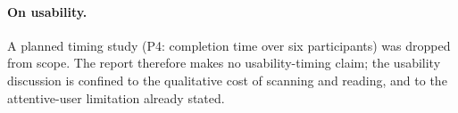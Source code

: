 \paragraph{On usability.}
A planned timing study (P4: completion time over six participants) was dropped
from scope. The report therefore makes no usability-timing claim; the usability
discussion is confined to the qualitative cost of scanning and reading, and to
the attentive-user limitation already stated.
